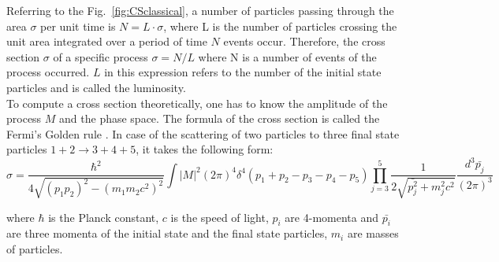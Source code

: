 Referring to the Fig.~\ref{fig:CSclassical}, a number of particles passing through the area $\sigma$ per unit time is $N=L \cdot \sigma$, where L is the number of particles crossing the unit area integrated over a period of time $N$ events occur. Therefore, the cross section $\sigma$ of a specific process $\sigma=N/L$ where N is a number of events of the process occurred. $L$ in this expression refers to the number of the initial state particles and is called the luminosity. \\
  



To compute a cross section theoretically, one has to know the amplitude of the process $M$ and the phase space. The formula of the cross section is called the Fermi's Golden rule \cite{ref_Griffiths}. In case of the scattering of two particles to three final state particles $1+2\rightarrow 3+4+5$, it takes the following form:\\

\begin{equation}\label{eq:FermiGoldenRule}
\sigma = \frac{ \hbar^2 }{4\sqrt{(p_1p_2)^2-(m_1m_2c^2)^2}} \int |M|^2 (2\pi)^4 \delta^4(p_1+p_2-p_3-p_4-p_5) \prod_{j=3}^{5} \frac{1}{2 \sqrt{\bar{p_j^2}+m_j^2 c^2}}\frac{d^3\bar{p_j}}{(2\pi)^3}  
\end{equation}

where $\hbar$ is the Planck constant, $c$ is the speed of light, $p_i$ are 4-momenta and ${\bar{p_i}}$ are three momenta of the initial state and the final state particles, $m_i$ are masses of particles.\\ 


